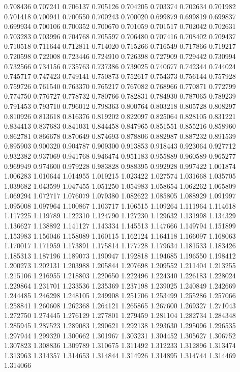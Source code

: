 0.708436
0.707241
0.706137
0.705126
0.704205
0.703374
0.702634
0.701982
0.701418
0.700941
0.700550
0.700243
0.700020
0.699879
0.699819
0.699837
0.699934
0.700106
0.700352
0.700670
0.701059
0.701517
0.702042
0.702631
0.703283
0.703996
0.704768
0.705597
0.706480
0.707416
0.708402
0.709437
0.710518
0.711644
0.712811
0.714020
0.715266
0.716549
0.717866
0.719217
0.720598
0.722008
0.723446
0.724910
0.726398
0.727909
0.729442
0.730994
0.732566
0.734156
0.735763
0.737386
0.739025
0.740677
0.742344
0.744024
0.745717
0.747423
0.749141
0.750873
0.752617
0.754373
0.756144
0.757928
0.759726
0.761540
0.763370
0.765217
0.767082
0.768966
0.770871
0.772799
0.774750
0.776727
0.778732
0.780766
0.782831
0.784930
0.787065
0.789239
0.791453
0.793710
0.796012
0.798363
0.800764
0.803218
0.805728
0.808297
0.810926
0.813618
0.816376
0.819202
0.822097
0.825064
0.828105
0.831221
0.834413
0.837683
0.841031
0.844458
0.847965
0.851551
0.855216
0.858960
0.862781
0.866678
0.870649
0.874693
0.878806
0.882987
0.887232
0.891539
0.895903
0.900320
0.904787
0.909300
0.913853
0.918443
0.923064
0.927712
0.932382
0.937069
0.941768
0.946474
0.951183
0.955889
0.960589
0.965277
0.969949
0.974600
0.979228
0.983828
0.988395
0.992928
0.997422
1.001874
1.006283
1.010644
1.014955
1.019215
1.023422
1.027574
1.031668
1.035705
1.039682
1.043599
1.047455
1.051250
1.054983
1.058654
1.062262
1.065809
1.069294
1.072717
1.076079
1.079380
1.082622
1.085805
1.088929
1.091997
1.095008
1.097964
1.100867
1.103717
1.106515
1.109264
1.111964
1.114618
1.117225
1.119789
1.122310
1.124790
1.127230
1.129632
1.131998
1.134329
1.136627
1.138892
1.141127
1.143334
1.145513
1.147666
1.149794
1.151899
1.153983
1.156046
1.158089
1.160115
1.162124
1.164118
1.166097
1.168063
1.170017
1.171959
1.173891
1.175814
1.177728
1.179634
1.181533
1.183426
1.185313
1.187196
1.189073
1.190947
1.192818
1.194685
1.196550
1.198412
1.200273
1.202131
1.203988
1.205844
1.207698
1.209552
1.211404
1.213255
1.215106
1.216955
1.218803
1.220650
1.222496
1.224340
1.226183
1.228024
1.229864
1.231701
1.233536
1.235369
1.237198
1.239025
1.240849
1.242669
1.244485
1.246298
1.248105
1.249908
1.251706
1.253499
1.255286
1.257066
1.258841
1.260608
1.262368
1.264121
1.265865
1.267600
1.269327
1.271043
1.272750
1.274445
1.276129
1.277801
1.279459
1.281104
1.282734
1.284348
1.285945
1.287523
1.289083
1.290621
1.292138
1.293630
1.295096
1.296535
1.297944
1.299320
1.300662
1.301967
1.303231
1.304452
1.305627
1.306752
1.307823
1.308836
1.309789
1.310675
1.311492
1.312233
1.312896
1.313474
1.313963
1.314357
1.314653
1.314844
1.314926
1.314895
1.314744
1.314469
1.314066
